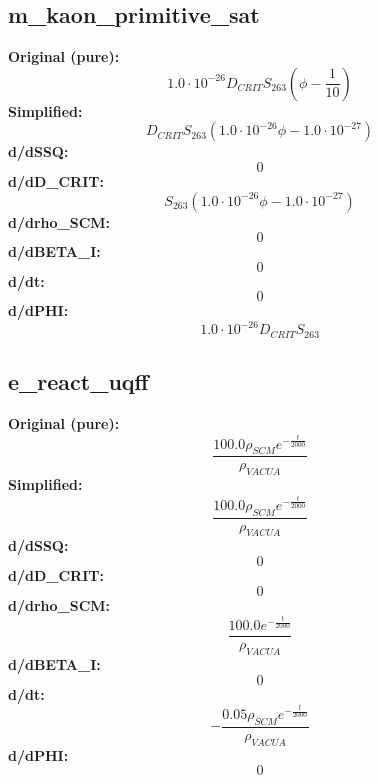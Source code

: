 \subsection{m_kaon_primitive_sat}
\textbf{Original (pure):}
\begin{equation}
1.0 \cdot 10^{-26} D_{CRIT} S_{26 3} \left(\phi - \frac{1}{10}\right)
\end{equation}
\textbf{Simplified:}
\begin{equation}
D_{CRIT} S_{26 3} \left(1.0 \cdot 10^{-26} \phi - 1.0 \cdot 10^{-27}\right)
\end{equation}
\textbf{d/dSSQ:}
\begin{equation}
0
\end{equation}
\textbf{d/dD_CRIT:}
\begin{equation}
S_{26 3} \left(1.0 \cdot 10^{-26} \phi - 1.0 \cdot 10^{-27}\right)
\end{equation}
\textbf{d/drho_SCM:}
\begin{equation}
0
\end{equation}
\textbf{d/dBETA_I:}
\begin{equation}
0
\end{equation}
\textbf{d/dt:}
\begin{equation}
0
\end{equation}
\textbf{d/dPHI:}
\begin{equation}
1.0 \cdot 10^{-26} D_{CRIT} S_{26 3}
\end{equation}

\subsection{e_react_uqff}
\textbf{Original (pure):}
\begin{equation}
\frac{100.0 \rho_{SCM} e^{- \frac{t}{2000}}}{\rho_{VAC UA}}
\end{equation}
\textbf{Simplified:}
\begin{equation}
\frac{100.0 \rho_{SCM} e^{- \frac{t}{2000}}}{\rho_{VAC UA}}
\end{equation}
\textbf{d/dSSQ:}
\begin{equation}
0
\end{equation}
\textbf{d/dD_CRIT:}
\begin{equation}
0
\end{equation}
\textbf{d/drho_SCM:}
\begin{equation}
\frac{100.0 e^{- \frac{t}{2000}}}{\rho_{VAC UA}}
\end{equation}
\textbf{d/dBETA_I:}
\begin{equation}
0
\end{equation}
\textbf{d/dt:}
\begin{equation}
- \frac{0.05 \rho_{SCM} e^{- \frac{t}{2000}}}{\rho_{VAC UA}}
\end{equation}
\textbf{d/dPHI:}
\begin{equation}
0
\end{equation}

